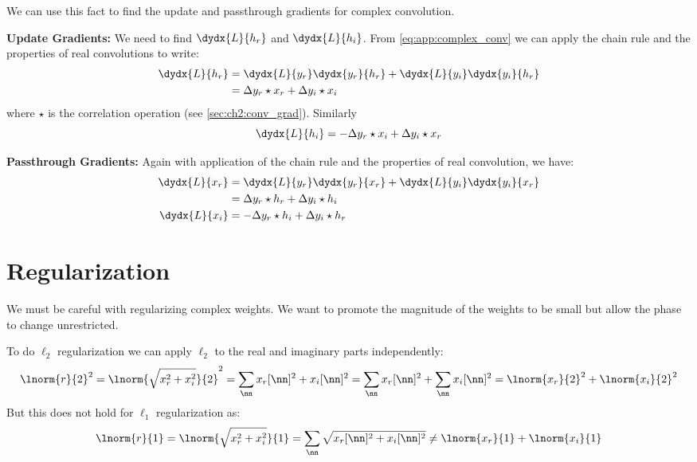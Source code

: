 We can use this fact to find the update and passthrough gradients for complex
convolution.

\textbf{Update Gradients:} We need to find $\dydx{L}{h_r}$ and $\dydx{L}{h_i}$.
From \eqref{eq:app:complex_conv} we can apply the chain rule and the properties
of real convolutions to write:
\begin{align}
  \dydx{L}{h_r} &= \dydx{L}{y_r}\dydx{y_r}{h_r} + \dydx{L}{y_i}\dydx{y_i}{h_r} \\
                &= \Delta y_r \star x_r + \Delta y_i \star x_i
\end{align}
where $\star$ is the correlation operation (see \autoref{sec:ch2:conv_grad}).
Similarly 
\begin{equation}
  \dydx{L}{h_i} = -\Delta y_r \star x_i + \Delta y_i \star x_r
\end{equation}

\textbf{Passthrough Gradients:} Again with application of the chain rule and the
properties of real convolution, we have:
\begin{align}
  \dydx{L}{x_r} &= \dydx{L}{y_r}\dydx{y_r}{x_r} + \dydx{L}{y_i}\dydx{y_i}{x_r} \\
                &= \Delta y_r \star h_r + \Delta y_i \star h_i \\
  \dydx{L}{x_i} &= -\Delta y_r \star h_i + \Delta y_i \star h_r
\end{align}

\section{Regularization}\label{sec:appE:complex_reg}
We must be careful with regularizing complex weights. We want to promote the
magnitude of the weights to be small but allow the phase to change unrestricted.

To do $\ell_2$ regularization we can apply $\ell_2$ to the real and imaginary parts
independently:
\begin{equation}
  \lnorm{r}{2}^2 = \lnorm{\sqrt{x_r^2+x_i^2}}{2}^2 = \sum_{\nn} x_r[\nn]^2 + x_i[\nn]^2 = 
  \sum_\nn x_r[\nn]^2 + \sum_\nn x_i[\nn]^2 = \lnorm{x_r}{2}^2 + \lnorm{x_i}{2}^2
\end{equation}
But this does not hold for $\ell_1$ regularization as:
\begin{equation}
  \lnorm{r}{1} = \lnorm{\sqrt{x_r^2+x_i^2}}{1} = \sum_\nn \sqrt{x_r[\nn]^2 + x_i[\nn]^2} \neq \lnorm{x_r}{1} + \lnorm{x_i}{1}
\end{equation}

